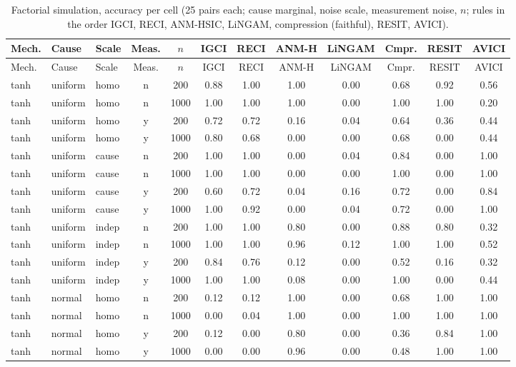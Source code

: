 \begingroup\scriptsize\setlength{\tabcolsep}{2.5pt}
\begin{longtable}{@{}lllccccccccc@{}}
\caption{Factorial simulation, accuracy per cell (25 pairs each; cause marginal, noise scale, measurement noise, $n$; rules in the order IGCI, RECI, ANM-HSIC, LiNGAM, compression (faithful), RESIT, AVICI).}\label{tab:cells}\\
\toprule
Mech. & Cause & Scale & Meas. & $n$ & IGCI & RECI & ANM-H & LiNGAM & Cmpr. & RESIT & AVICI\\
\midrule
\endfirsthead
\toprule
Mech. & Cause & Scale & Meas. & $n$ & IGCI & RECI & ANM-H & LiNGAM & Cmpr. & RESIT & AVICI\\
\midrule
\endhead
tanh & uniform & homo & n & 200 & 0.88 & 1.00 & 1.00 & 0.00 & 0.68 & 0.92 & 0.56\\
tanh & uniform & homo & n & 1000 & 1.00 & 1.00 & 1.00 & 0.00 & 1.00 & 1.00 & 0.20\\
tanh & uniform & homo & y & 200 & 0.72 & 0.72 & 0.16 & 0.04 & 0.64 & 0.36 & 0.44\\
tanh & uniform & homo & y & 1000 & 0.80 & 0.68 & 0.00 & 0.00 & 0.68 & 0.00 & 0.44\\
tanh & uniform & cause & n & 200 & 1.00 & 1.00 & 0.00 & 0.04 & 0.84 & 0.00 & 1.00\\
tanh & uniform & cause & n & 1000 & 1.00 & 1.00 & 0.00 & 0.00 & 1.00 & 0.00 & 1.00\\
tanh & uniform & cause & y & 200 & 0.60 & 0.72 & 0.04 & 0.16 & 0.72 & 0.00 & 0.84\\
tanh & uniform & cause & y & 1000 & 1.00 & 0.92 & 0.00 & 0.04 & 0.72 & 0.00 & 1.00\\
tanh & uniform & indep & n & 200 & 1.00 & 1.00 & 0.80 & 0.00 & 0.88 & 0.80 & 0.32\\
tanh & uniform & indep & n & 1000 & 1.00 & 1.00 & 0.96 & 0.12 & 1.00 & 1.00 & 0.52\\
tanh & uniform & indep & y & 200 & 0.84 & 0.76 & 0.12 & 0.00 & 0.52 & 0.16 & 0.32\\
tanh & uniform & indep & y & 1000 & 1.00 & 1.00 & 0.08 & 0.00 & 1.00 & 0.00 & 0.44\\
tanh & normal & homo & n & 200 & 0.12 & 0.12 & 1.00 & 0.00 & 0.68 & 1.00 & 1.00\\
tanh & normal & homo & n & 1000 & 0.00 & 0.04 & 1.00 & 0.00 & 1.00 & 1.00 & 1.00\\
tanh & normal & homo & y & 200 & 0.12 & 0.00 & 0.80 & 0.00 & 0.36 & 0.84 & 1.00\\
tanh & normal & homo & y & 1000 & 0.00 & 0.00 & 0.96 & 0.00 & 0.48 & 1.00 & 1.00\\

\end{longtable}
